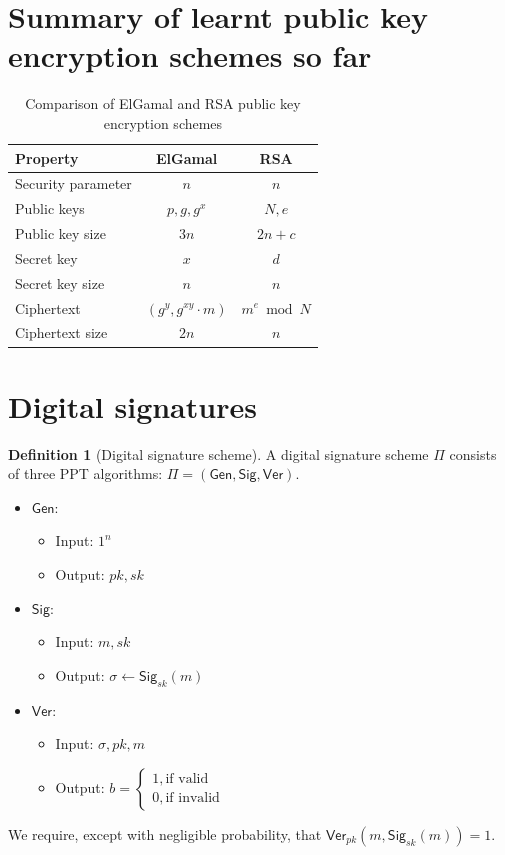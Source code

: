 \documentclass[11pt]{article}
\theoremstyle{definition}
\newtheorem{definition}{Definition}[section]
\theoremstyle{proof}
\newcommand{\Gen}{\mathsf{Gen}}
\newcommand{\Sig}{\mathsf{Sig}}
\newcommand{\Ver}{\mathsf{Ver}}
\begin{document}
	\section{Summary of learnt public key encryption schemes so far}
	
	\begin{table}[h]
		\centering
		\begin{tabular}{|l|c|c|}
			\hline
			\textbf{Property} & \textbf{ElGamal} & \textbf{RSA} \\
			\hline
			Security parameter & $n$ & $n$ \\
			\hline
			Public keys & $p, g, g^x$ & $N, e$ \\
			\hline
			Public key size & $3n$ & $2n + c$ \\
			\hline
			Secret key & $x$ & $d$ \\
			\hline
			Secret key size & $n$ & $n$ \\
			\hline
			Ciphertext & $(g^y, g^{xy}\cdot m)$ & $m^e \bmod N$ \\
			\hline
			Ciphertext size & $2n$ & $n$ \\
			\hline
		\end{tabular}
		\caption{Comparison of ElGamal and RSA public key encryption schemes}
	\end{table}
	
	\section{Digital signatures}
	
	\begin{definition}[Digital signature scheme]
		\leavevmode
		A digital signature scheme $\Pi$ consists of three PPT algorithms: $\Pi = (\Gen, \Sig, \Ver)$.
		\begin{itemize}
			\item $\Gen$:
			\begin{itemize}
				\item Input: $1^n$
				\item Output: $pk, sk$
			\end{itemize}
			\item $\Sig$:
			\begin{itemize}
				\item Input: $m, sk$
				\item Output: $\sigma \leftarrow \Sig_{sk}(m)$
			\end{itemize}
			\item $\Ver$:
			\begin{itemize}
				\item Input: $\sigma, pk, m$
				\item Output: $b =
				\begin{cases}
					1, \text{if valid}\\
					0, \text{if invalid}
				\end{cases}$
			\end{itemize}
		\end{itemize}
		We require, except with negligible probability, that $\Ver_{pk}(m, \Sig_{sk}(m)) = 1$.
	\end{definition}
	
\end{document}
